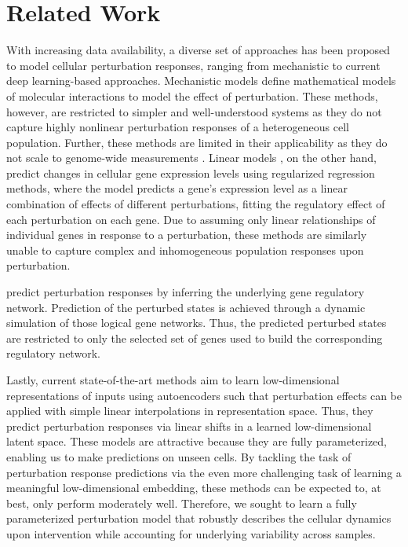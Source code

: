 \section{Related Work}

 With increasing data availability, a diverse set of approaches has been proposed to model cellular perturbation responses, ranging from mechanistic to current deep learning-based approaches.
Mechanistic models \citep{yuan2021cellbox, frohlich2018efficient} define mathematical models of molecular interactions to model the effect of perturbation.
These methods, however, are restricted to simpler and well-understood systems as they do not capture highly nonlinear perturbation responses of a heterogeneous cell population. Further, these methods are limited in their applicability as they do not scale to genome-wide measurements \citep{snijder2012single, berchtold2018systems, green2016systems}.
Linear models \citep{dixit2016perturb, kamimoto2020celloracle}, on the other hand,  predict changes in cellular gene expression levels using regularized regression methods, where the model predicts a gene's expression level as a linear combination of effects of different perturbations, fitting the regulatory effect of each perturbation on each gene.
Due to assuming only linear relationships of individual genes in response to a perturbation, these methods are similarly  unable to capture complex and inhomogeneous population responses upon perturbation.

\citet{heydari2022iqcell} predict perturbation responses by inferring the underlying gene regulatory network. Prediction of the perturbed states is achieved through a dynamic simulation of those logical gene networks. Thus, the predicted perturbed states are restricted to only the selected set of genes used to build the corresponding regulatory network.

Lastly, current state-of-the-art methods \citep{lopez2018scvi, lotfollahi2019scgen, yang2020predicting} aim to learn low-dimensional representations of inputs using autoencoders such that perturbation effects can be applied with simple linear interpolations in representation space. Thus, they predict perturbation responses via linear shifts in a learned low-dimensional latent space. These models are attractive because they are fully parameterized, enabling us to make predictions on unseen cells. By tackling the task of perturbation response predictions via the even more challenging task of learning a meaningful low-dimensional embedding, these methods can be expected to, at best, only perform moderately well. Therefore, we sought to learn a fully parameterized perturbation model that robustly describes the cellular dynamics upon intervention while accounting for underlying variability across samples.

